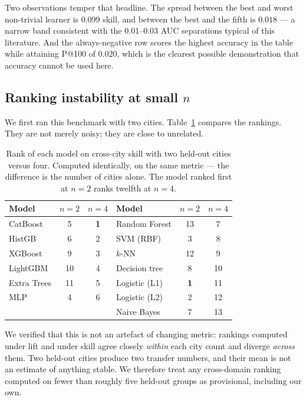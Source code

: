 \documentclass[11pt]{article}
\newcommand{\best}[1]{\textbf{#1}}
\begin{document}
Two observations temper that headline. The spread between the best and worst
non-trivial learner is $0.099$ skill, and between the best and the fifth is
$0.018$ --- a narrow band consistent with the \numrange{0.01}{0.03} AUC
separations typical of this literature. And the always-negative row scores the
highest accuracy in the table while attaining P@100 of $0.020$, which is the
clearest possible demonstration that accuracy cannot be used here.

\subsection{Ranking instability at small \texorpdfstring{$n$}{n}}\label{sec:instability}
We first ran this benchmark with two cities. Table~\ref{tab:flip} compares the
rankings. They are not merely noisy; they are close to unrelated.

\begin{table}[t]
\centering\small
\caption{Rank of each model on cross-city skill with two held-out cities versus
four. Computed identically, on the same metric --- the difference is the number
of cities alone. The model ranked first at $n{=}2$ ranks twelfth at $n{=}4$.}
\label{tab:flip}
\begin{tabular}{@{}lcc@{\hskip 2em}lcc@{}}
\toprule
Model & $n{=}2$ & $n{=}4$ & Model & $n{=}2$ & $n{=}4$ \\
\midrule
CatBoost      & 5  & \best{1} & Random Forest & 13 & 7  \\
HistGB        & 6  & 2 & SVM (RBF)     & 3  & 8  \\
XGBoost       & 9  & 3 & $k$-NN        & 12 & 9  \\
LightGBM      & 10 & 4 & Decision tree & 8  & 10 \\
Extra Trees   & 11 & 5 & Logistic (L1) & \best{1}  & 11 \\
MLP           & 4  & 6 & Logistic (L2) & 2  & 12 \\
              &    &   & Naive Bayes   & 7  & 13 \\
\bottomrule
\end{tabular}
\end{table}

We verified that this is not an artefact of changing metric: rankings computed
under lift and under skill agree closely \emph{within} each city count and
diverge \emph{across} them. Two held-out cities produce two transfer numbers, and
their mean is not an estimate of anything stable. We therefore treat any
cross-domain ranking computed on fewer than roughly five held-out groups as
provisional, including our own.
\end{document}
